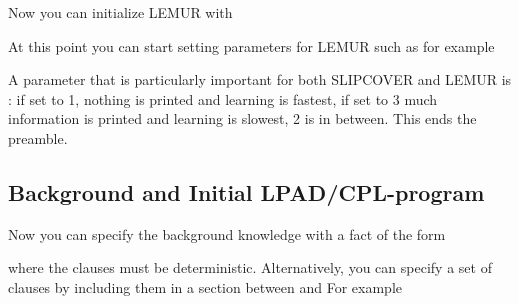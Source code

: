 \documentclass[letterpaper,10pt,english]{sphinxmanual}
\begin{document}
\begin{sphinxVerbatim}[commandchars=\\\{\}]
 
\end{sphinxVerbatim}

Now you can initialize LEMUR with

\begin{sphinxVerbatim}[commandchars=\\\{\}]
 
\end{sphinxVerbatim}

At this point you can start setting parameters for LEMUR such as for example

\begin{sphinxVerbatim}[commandchars=\\\{\}]
 
\end{sphinxVerbatim}

A parameter that is particularly important for both SLIPCOVER and LEMUR is : if set to 1, nothing is printed and learning is fastest, if set to 3 much information is printed and learning is slowest, 2 is in between. This ends the preamble.


\subsection{Background and Initial LPAD/CPL-program}
\label{\detokenize{index:background-and-initial-lpad-cpl-program}}
Now you can specify the background knowledge with a fact of the form

\begin{sphinxVerbatim}[commandchars=\\\{\}]
    
\end{sphinxVerbatim}

where the clauses must be deterministic.
Alternatively, you can specify a set of clauses by including them in a section between  and 
For example
\end{document}
